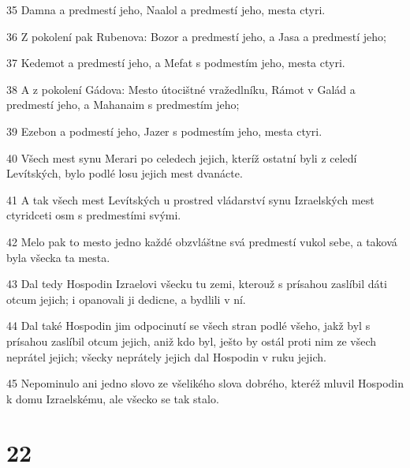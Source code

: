 \par 35 Damna a predmestí jeho, Naalol a predmestí jeho, mesta ctyri.
\par 36 Z pokolení pak Rubenova: Bozor a predmestí jeho, a Jasa a predmestí jeho;
\par 37 Kedemot a predmestí jeho, a Mefat s podmestím jeho, mesta ctyri.
\par 38 A z pokolení Gádova: Mesto útocištné vražedlníku, Rámot v Galád a predmestí jeho, a Mahanaim s predmestím jeho;
\par 39 Ezebon a podmestí jeho, Jazer s podmestím jeho, mesta ctyri.
\par 40 Všech mest synu Merari po celedech jejich, kteríž ostatní byli z celedí Levítských, bylo podlé losu jejich mest dvanácte.
\par 41 A tak všech mest Levítských u prostred vládarství synu Izraelských mest ctyridceti osm s predmestími svými.
\par 42 Melo pak to mesto jedno každé obzvláštne svá predmestí vukol sebe, a taková byla všecka ta mesta.
\par 43 Dal tedy Hospodin Izraelovi všecku tu zemi, kterouž s prísahou zaslíbil dáti otcum jejich; i opanovali ji dedicne, a bydlili v ní.
\par 44 Dal také Hospodin jim odpocinutí se všech stran podlé všeho, jakž byl s prísahou zaslíbil otcum jejich, aniž kdo byl, ješto by ostál proti nim ze všech neprátel jejich; všecky neprátely jejich dal Hospodin v ruku jejich.
\par 45 Nepominulo ani jedno slovo ze všelikého slova dobrého, kteréž mluvil Hospodin k domu Izraelskému, ale všecko se tak stalo.

\chapter{22}

